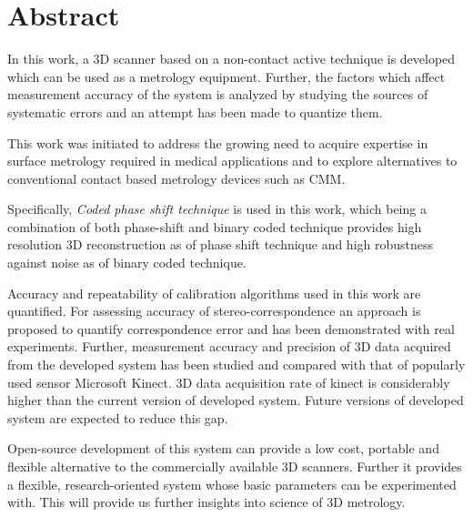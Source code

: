 % 
% 
%
\chapter*{Abstract}
In this work, a 3D scanner based on a non-contact active technique is developed which can be used as a metrology equipment.  Further, the factors which affect measurement accuracy of the system is analyzed by studying the sources of systematic errors and an attempt has been made to quantize them.\newline

This work was initiated to address the growing need to acquire expertise in surface metrology required in medical applications and to explore alternatives to conventional contact based metrology devices such as CMM.\newline

Specifically, \textit{Coded phase shift technique} is used in this work, which being a combination of both phase-shift and binary coded technique provides high resolution 3D reconstruction as of phase shift technique and high robustness against noise as of binary coded technique.\newline

Accuracy and repeatability of calibration algorithms used in this work are quantified. For assessing accuracy of stereo-correspondence an approach is proposed to quantify correspondence error and has been demonstrated with real experiments.  Further, measurement accuracy and precision of 3D data acquired from the developed system has been studied and compared with that of popularly used sensor Microsoft Kinect. 3D data acquisition rate of kinect is considerably higher than the current version of developed system. Future versions of developed system are expected to reduce this gap.\newline

Open-source development of this system can provide a low cost, portable and flexible alternative to the commercially available 3D scanners. Further it provides a flexible, research-oriented system whose basic parameters can be experimented with. This will provide us further insights into science of 3D metrology. 

